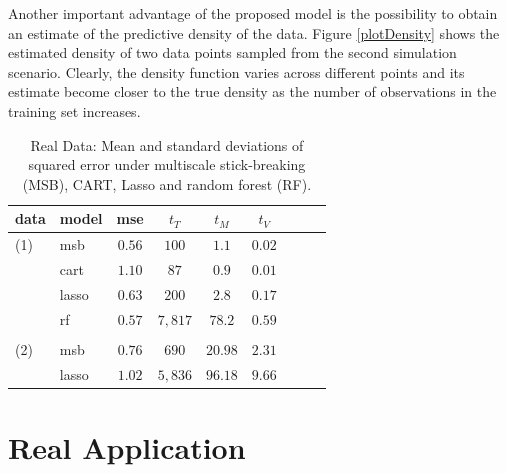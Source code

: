 \documentclass{article}
\begin{document}
Another important advantage of the proposed model is the possibility to obtain an estimate of the predictive density of the data. Figure \ref{plotDensity} shows the estimated density of two data points sampled from the second simulation scenario. Clearly, the density function varies  across different points and its estimate become closer to the true density as the number of observations in the training set increases.



\begin{table}[t]
\caption{Real Data: Mean and standard deviations of squared error under multiscale stick-breaking (MSB), CART, Lasso and random forest (RF).}\label{real}
\vskip 0.15in
\begin{center}
\begin{small}
\begin{sc}
\begin{tabular}{llccccccc}
\hline
\abovespace\belowspace
data  &model&mse&$t_{T}$ & $t_{M}$ & $t_{V}$\\
\hline
\abovespace
\belowspace
(1)&msb &$0.56$ & $100$ & $1.1$& $0.02$\\
 & cart & $1.10$ & $87$ & $0.9$ &$0.01$\\
& lasso & $0.63$  & $200$ & $2.8$ & $0.17$\\
& rf & $0.57$ &  $7,817$ & $78.2$ & $0.59$\\
\\
(2)&msb &$0.76$ & $690$ & $20.98$& $2.31$\\
 & lasso & $1.02$  & $5,836$ & $96.18$ & $9.66$\\
\hline
\end{tabular}
\end{sc}
\end{small}
\end{center}
\vskip -0.1in
\end{table}


\section{Real Application}
\end{document}
